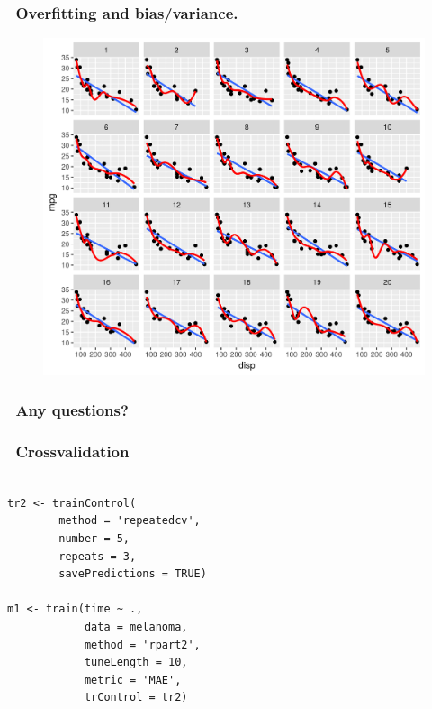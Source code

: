 \documentclass[handout, aspectratio = 169]{beamer}
\begin{document}
\begin{frame}
\frametitle{\insertframenumber~Overfitting and bias/variance.}

\begin{figure}
    \includegraphics[height = 0.8\textheight]{bias-variance.png}
\end{figure} 

\end{frame} 




\begin{frame}
\frametitle{\insertframenumber~Any questions?}


\end{frame} 


\begin{frame}[fragile]
\frametitle{\insertframenumber~Crossvalidation}
\begin{Verbatim}

tr2 <- trainControl(
        method = 'repeatedcv',
        number = 5,
        repeats = 3, 
        savePredictions = TRUE)

m1 <- train(time ~ ., 
            data = melanoma,
            method = 'rpart2',
            tuneLength = 10,
            metric = 'MAE',
            trControl = tr2)

\end{Verbatim}

\end{frame} 
\end{document}
